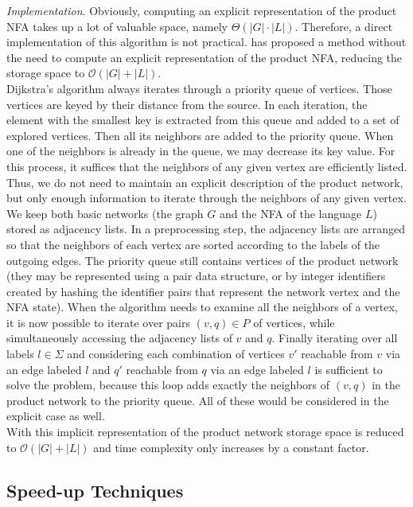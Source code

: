 \documentclass[]{article}
\numberwithin{equation}{section}
\begin{document}
\noindent \textit{Implementation}. Obviously, computing an explicit representation of the product NFA takes up a lot of valuable space, namely $\Theta(|G|\cdot|L|)$. Therefore, a direct implementation of this algorithm is not practical. \cite{BB+08} has proposed a method without the need to compute an explicit representation of the product NFA, reducing the storage space to $\mathcal{O}(|G|+|L|)$.\\
Dijkstra's algorithm always iterates through a priority queue of vertices. Those vertices are keyed by their distance from the source. In each iteration, the element with the smallest key is extracted from this queue and added to a set of explored vertices. Then all its neighbors are added to the priority queue. When one of the neighbors is already in the queue, we may decrease its key value. For this process, it suffices that the neighbors of any given vertex are efficiently listed.\\
Thus, we do not need to maintain an explicit description of the product network, but only enough information to iterate through the neighbors of any given vertex. We keep both basic networks (the graph $G$ and the NFA of the language $L$) stored as adjacency lists. In a preprocessing step, the adjacency lists are arranged so that the neighbors of each vertex are sorted according to the labels of the outgoing edges. The priority queue still contains vertices of the product network (they may be represented using a pair data structure, or by integer identifiers created by hashing the identifier pairs that represent the network vertex and the NFA state). When the algorithm needs to examine all the neighbors of a vertex, it is now possible to iterate over pairs $(v, q) \in P$ of vertices, while simultaneously accessing the adjacency lists of $v$ and $q$. Finally iterating over all labels $l\in \Sigma$ and considering each combination of vertices $v'$ reachable from $v$ via an edge labeled $l$ and $q'$ reachable from $q$ via an edge labeled $l$ is sufficient to solve the problem, because this loop adds exactly the neighbors of $(v, q)$ in the product network to the priority queue. All of these would be considered in the explicit case as well.\\
With this implicit representation of the product network storage space is reduced to $\mathcal{O}(|G|+|L|)$ and time complexity only increases by a constant factor.

\subsection{Speed-up Techniques}
\label{sec:shp:speed}
\end{document}
